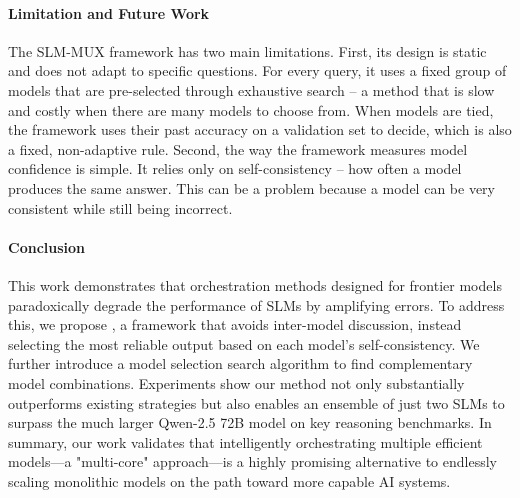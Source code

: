 \paragraph{Limitation and Future Work} The SLM-MUX framework has two main limitations. First, its design is static and does not adapt to specific questions. For every query, it uses a fixed group of models that are pre-selected through exhaustive search -- a method that is slow and costly when there are many models to choose from. When models are tied, the framework uses their past accuracy on a validation set to decide, which is also a fixed, non-adaptive rule. Second, the way the framework measures model confidence is simple. It relies only on self-consistency -- how often a model produces the same answer. This can be a problem because a model can be very consistent while still being incorrect.


\paragraph{Conclusion} 
This work demonstrates that orchestration methods designed for frontier models paradoxically degrade the performance of SLMs by amplifying errors. To address this, we propose \NAME{}, a framework that avoids inter-model discussion, instead selecting the most reliable output based on each model's self-consistency. We further introduce a model selection search algorithm to find complementary model combinations. Experiments show our method not only substantially outperforms existing strategies but also enables an ensemble of just two SLMs to surpass the much larger Qwen-2.5 72B model on key reasoning benchmarks. In summary, our work validates that intelligently orchestrating multiple efficient models—a "multi-core" approach—is a highly promising alternative to endlessly scaling monolithic models on the path toward more capable AI systems.


